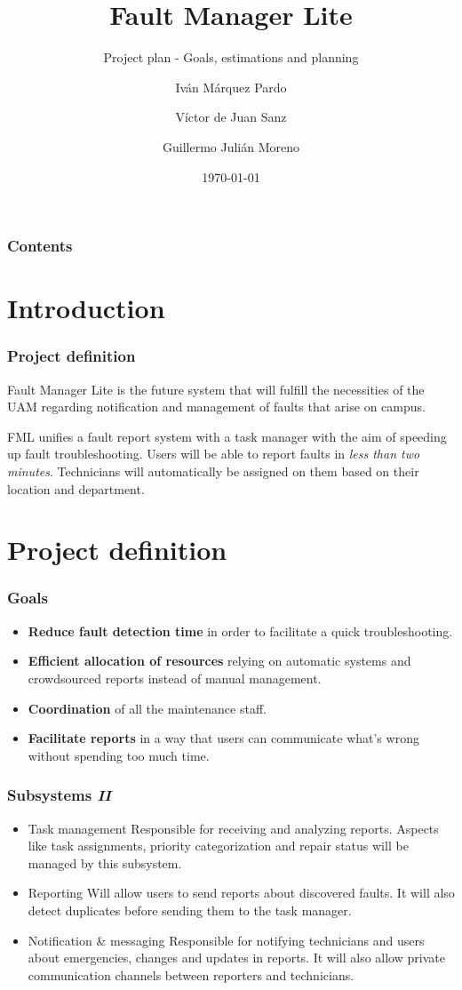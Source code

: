 \documentclass[10pt, compress,usetitleprogressbar,aspectratio=1610]{beamer}
\title{Fault Manager Lite}
\subtitle{Project plan - Goals, estimations and planning}
\date{\today}
\author{Iván Márquez Pardo \and Víctor de Juan Sanz \and Guillermo Julián Moreno}
\institute{Triforce}
\begin{document}
\maketitle

\begin{frame}
\frametitle{Contents}
\tableofcontents
\end{frame}

\section{Introduction}
\begin{frame}[fragile]
\frametitle{Project definition}

Fault Manager Lite is the future system that will fulfill the necessities of the UAM regarding notification and management of faults that arise on campus.

FML unifies a fault report system with a task manager with the aim of speeding up fault troubleshooting. Users will be able to report faults in \emph{less than two minutes}. Technicians will automatically be assigned on them based on their location and department.
\end{frame}

\section{Project definition}

\begin{frame}
\frametitle{Goals}

\begin{itemize}
\item \textbf{Reduce fault detection time} in order to facilitate a quick troubleshooting.
\item \textbf{Efficient allocation of resources} relying on automatic systems and crowdsourced reports instead of manual management.
\item \textbf{Coordination} of all the maintenance staff.
\item \textbf{Facilitate reports} in a way that users can communicate what's wrong without spending too much time.
\end{itemize}
\end{frame}

\begin{frame}
\frametitle{Subsystems \hfill \emph{II}}
\begin{itemize}
\item \alert{Task management} Responsible for receiving and analyzing reports. Aspects like task assignments, priority categorization and repair status will be managed by this subsystem.
\item \alert{Reporting} Will allow users to send reports about discovered faults. It will also detect duplicates before sending them to the task manager.
\item \alert{Notification \& messaging} Responsible for notifying technicians and users about emergencies, changes and updates in reports. It will also allow private communication channels between reporters and technicians.
\end{itemize}
\end{frame}
\end{document}
